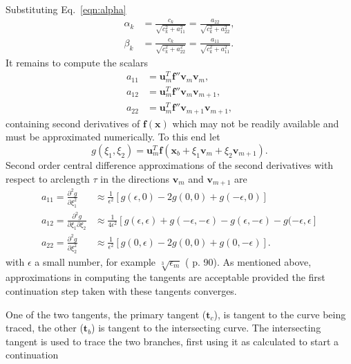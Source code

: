 \documentclass[10pt,openany,twoside]{book}
\numberwithin{equation}{section}   %
\newcommand{\Vector}[1]{\boldsymbol{#1}}
\newcommand{\Eqn}[1]{Eq.\ \ref{#1}}
\begin{document}
Substituting \Eqn{eqn:alpha}
\begin{align*}
\alpha_k &= \frac{c_k}{\sqrt{c_k^2 + a_{11}^2}} = \frac{a_{22}}{\sqrt{c_k^2 + a_{22}^2}}, \nonumber \\
\beta_k &=  \frac{c_k}{\sqrt{c_k^2 + a_{22}^2}} = \frac{a_{11}}{\sqrt{c_k^2 + a_{11}^2}}.
\end{align*}
It remains to compute the scalars
\begin{align*}
 a_{11} &= \Vector{u}_m^T\Vector{f}''\Vector{v}_m\Vector{v}_m, \nonumber \\
 a_{12} &= \Vector{u}_m^T\Vector{f}''\Vector{v}_m\Vector{v}_{m+1}, \nonumber \\
 a_{22} &= \Vector{u}_m^T\Vector{f}''\Vector{v}_{m+1}\Vector{v}_{m+1},
\end{align*}
containing
second derivatives of $\Vector{f}(\Vector{x})$ which may not be
readily available and must be approximated numerically.
To this end let
\begin{equation*}
g(\xi_1,\xi_2) = \Vector{u}_m^T\Vector{f}(\Vector{x}_b
	+ \xi_1 \Vector{v}_m + \xi_2 \Vector{v}_{m+1}).
\end{equation*}
Second order central difference approximations of the second
derivatives with respect to arclength $\tau$ in the directions
$\Vector{v}_m$ and $\Vector{v}_{m+1}$ are
\begin{align*}
a_{11} = \frac{\partial^2g}{\partial \xi_1^2}
	&\approx \frac{1}{\epsilon^2} \left[ g(\epsilon,0)
	- 2g(0,0) + g(-\epsilon,0) \right] \nonumber \\
a_{12} = \frac{\partial^2g}{\partial \xi_1 \partial \xi_2}
	&\approx \frac{1}{4\epsilon^2} \left[ g(\epsilon,\epsilon)
	+ g(-\epsilon,-\epsilon) - g(\epsilon,-\epsilon)
	- g(-\epsilon,\epsilon \right] \nonumber \\
a_{22} = \frac{\partial^2g}{\partial \xi_2^2} &\approx
	\frac{1}{\epsilon^2} \left[ g(0,\epsilon) - 2g(0,0) + g(0,-\epsilon) \right].
\end{align*}
with $\epsilon$ a small number, for example $\sqrt[3]{\epsilon_m}$
(\cite{allgower1990numerical} p. 90).
As mentioned above, approximations in computing the tangents
are acceptable provided the first continuation step taken with
these tangents converges.
\par
One of the two tangents, the primary tangent ($\Vector{t}_c$),
is tangent to the curve being traced, the other ($\Vector{t}_b$) is tangent
to the intersecting curve. The intersecting tangent is used to trace
the two branches, first using it as calculated to start a continuation
\end{document}
